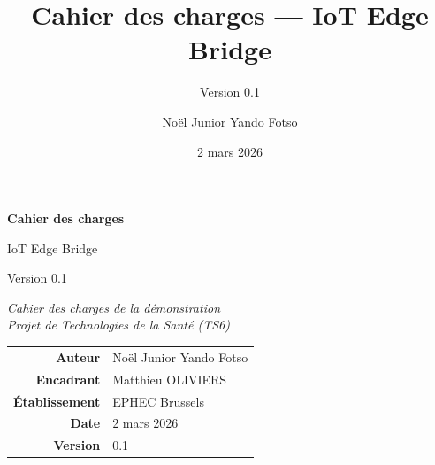 \documentclass[11pt,a4paper,french]{scrreprt}
\title{Cahier des charges --- IoT Edge Bridge}
\subtitle{Version 0.1}
\author{No\"el Junior Yando Fotso}
\date{2 mars 2026}
\begin{document}
\begin{titlepage}
  \centering
  \vspace*{2cm}
  {\color{bridgeblue}\Huge\bfseries Cahier des charges\par}
  \vspace{0.5cm}
  {\color{bridgeteal}\LARGE IoT Edge Bridge\par}
  \vspace{0.5cm}
  {\large Version 0.1\par}
  \vspace{2cm}
  {\itshape
   Cahier des charges de la d\'emonstration\\
   Projet de Technologies de la Sant\'e (TS6)\par}
  \vfill
  \begin{tabular}{rl}
    \textbf{Auteur}        & No\"el Junior Yando Fotso \\
    \textbf{Encadrant}     & Matthieu OLIVIERS         \\
    \textbf{\'Etablissement} & EPHEC Brussels           \\
    \textbf{Date}          & 2 mars 2026               \\
    \textbf{Version}       & 0.1                       \\
  \end{tabular}
  \vspace{1cm}
\end{titlepage}

\tableofcontents
\cleardoublepage
\listoffigures
\cleardoublepage
\listoftables
\cleardoublepage




















\printbibliography
\end{document}
